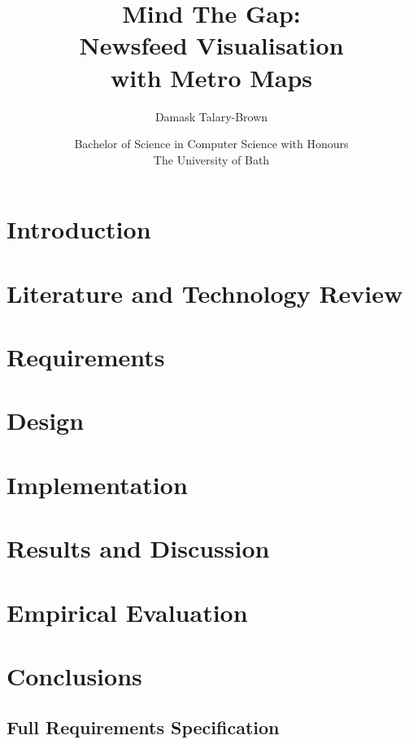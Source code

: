 \documentclass[11pt, a4paper, openright]{report}
\title{\Huge\textbf{Mind The Gap:\\Newsfeed Visualisation\\with Metro Maps}}
\author{Damask Talary-Brown}
\date{Bachelor of Science in Computer Science with Honours\\The University of Bath\\ \the\year}
\begin{document}
\setcounter{page}{0}
\maketitle
\newpage

\newpage

\newpage

\abstract
{}
\newpage
\tableofcontents
\newpage
\listoffigures
{}
\newpage

\setcounter{page}{1}

\chapter*{Introduction}


\chapter{Literature and Technology Review}


\chapter{Requirements}


\chapter{Design}


\chapter{Implementation}


\chapter{Results and Discussion}


\chapter{Empirical Evaluation}


\chapter{Conclusions}




\begin{appendices}
\chapter{Full Requirements Specification}

	
\end{appendices}
\end{document}
